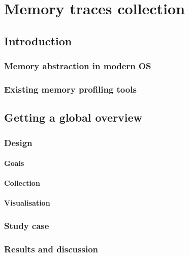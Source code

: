 \chapter{Memory traces collection}

\section{Introduction}

\subsection{Memory abstraction in modern OS}


\subsection{Existing memory profiling tools}


\section{Getting a global overview}


\subsection{Design}

\subsubsection{Goals}

\subsubsection{Collection}

\subsubsection{Visualisation}

\subsection{Study case}

\subsection{Results and discussion}


